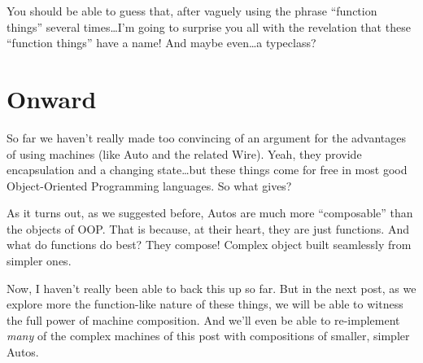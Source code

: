 \documentclass[]{article}
\begin{document}
You should be able to guess that, after vaguely using the phrase ``function things'' several
times\ldots{}I'm going to surprise you all with the revelation that these ``function things'' have a
name! And maybe even\ldots{}a typeclass?

\section{Onward}\label{onward}

So far we haven't really made too convincing of an argument for the advantages of using machines
(like Auto and the related Wire). Yeah, they provide encapsulation and a changing state\ldots{}but
these things come for free in most good Object-Oriented Programming languages. So what gives?

As it turns out, as we suggested before, Autos are much more ``composable'' than the objects of OOP.
That is because, at their heart, they are just functions. And what do functions do best? They
compose! Complex object built seamlessly from simpler ones.

Now, I haven't really been able to back this up so far. But in the next post, as we explore more the
function-like nature of these things, we will be able to witness the full power of machine
composition. And we'll even be able to re-implement \emph{many} of the complex machines of this post
with compositions of smaller, simpler Autos.
\end{document}
